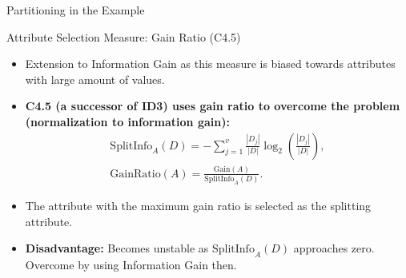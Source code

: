 \begin{frame}{Partitioning in the Example}
\end{frame}

\begin{frame}{Attribute Selection Measure: Gain Ratio (C4.5)}
	\begin{itemize}
		\item Extension to Information Gain as this measure is biased towards attributes with large amount of values.
		\item \textbf{C4.5 (a successor of ID3) uses gain ratio to overcome the problem (normalization to information gain):}
		      \begin{align*}
			      \text{SplitInfo}_A(D) = - \sum_{j=1}^{v} \frac{|D_j|}{|D|} \log_2\left( \frac{|D_j|}{|D|} \right), \\
			      \text{GainRatio}(A) = \frac{\text{Gain}(A)}{\text{SplitInfo}_A(D)}.
		      \end{align*}

		\item The attribute with the maximum gain ratio is selected as the splitting attribute.
		\item \textbf{Disadvantage:} Becomes unstable as $\text{SplitInfo}_A(D)$
		      approaches zero. Overcome by using Information Gain then.
	\end{itemize}
\end{frame}

